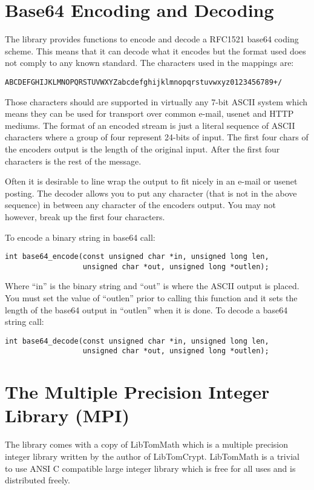 \documentclass[a4paper]{book}
\begin{document}
\section{Base64 Encoding and Decoding}
The library provides functions to encode and decode a RFC1521 base64 coding scheme.  This means that it can decode what it 
encodes but the format used does not comply to any known standard.  The characters used in the mappings are:
\begin{verbatim}
ABCDEFGHIJKLMNOPQRSTUVWXYZabcdefghijklmnopqrstuvwxyz0123456789+/
\end{verbatim}
Those characters should are supported in virtually any 7-bit ASCII system which means they can be used for transport over
common e-mail, usenet and HTTP mediums.  The format of an encoded stream is just a literal sequence of ASCII characters
where a group of four represent 24-bits of input.  The first four chars of the encoders output is the length of the 
original input.  After the first four characters is the rest of the message.

Often it is desirable to line wrap the output to fit nicely in an e-mail or usenet posting.  The decoder allows you to
put any character (that is not in the above sequence) in between any character of the encoders output.  You may not however,
break up the first four characters.

To encode a binary string in base64 call:
   
\begin{verbatim}
int base64_encode(const unsigned char *in, unsigned long len, 
                  unsigned char *out, unsigned long *outlen);
\end{verbatim}
Where ``in'' is the binary string and ``out'' is where the ASCII output is placed.  You must set the value of ``outlen'' prior
to calling this function and it sets the length of the base64 output in ``outlen'' when it is done.  To decode a base64 
string call:
\begin{verbatim}
int base64_decode(const unsigned char *in, unsigned long len, 
                  unsigned char *out, unsigned long *outlen);
\end{verbatim}

\section{The Multiple Precision Integer Library (MPI)}
The library comes with a copy of LibTomMath  which is a multiple precision integer library written by the
author of LibTomCrypt.  LibTomMath is a trivial to use ANSI C compatible large integer library which is free 
for all uses and is distributed freely.
\end{document}
